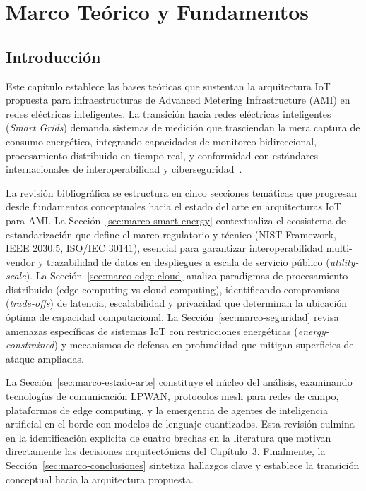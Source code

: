﻿\chapter{Marco Teórico y Fundamentos}
\label{chap:marco-teorico}


\section{Introducción}
\label{sec:marco-intro}

Este capítulo establece las bases teóricas que sustentan la arquitectura IoT propuesta para infraestructuras de Advanced Metering Infrastructure (AMI) en redes eléctricas inteligentes. La transición hacia redes eléctricas inteligentes (\textit{Smart Grids}) demanda sistemas de medición que trasciendan la mera captura de consumo energético, integrando capacidades de monitoreo bidireccional, procesamiento distribuido en tiempo real, y conformidad con estándares internacionales de interoperabilidad y ciberseguridad~\cite{SmartHomeEnergy2024,velasquezSmartGridsEmpowered2024}.

La revisión bibliográfica se estructura en cinco secciones temáticas que progresan desde fundamentos conceptuales hacia el estado del arte en arquitecturas IoT para AMI. La Sección~\ref{sec:marco-smart-energy} contextualiza el ecosistema de estandarización que define el marco regulatorio y técnico (NIST Framework, IEEE 2030.5, ISO/IEC 30141), esencial para garantizar interoperabilidad multi-vendor y trazabilidad de datos en despliegues a escala de servicio público (\textit{utility-scale}). La Sección~\ref{sec:marco-edge-cloud} analiza paradigmas de procesamiento distribuido (edge computing vs cloud computing), identificando compromisos (\textit{trade-offs}) de latencia, escalabilidad y privacidad que determinan la ubicación óptima de capacidad computacional. La Sección~\ref{sec:marco-seguridad} revisa amenazas específicas de sistemas IoT con restricciones energéticas (\textit{energy-constrained}) y mecanismos de defensa en profundidad que mitigan superficies de ataque ampliadas.

La Sección~\ref{sec:marco-estado-arte} constituye el núcleo del análisis, examinando tecnologías de comunicación LPWAN, protocolos mesh para redes de campo, plataformas de edge computing, y la emergencia de agentes de inteligencia artificial en el borde con modelos de lenguaje cuantizados. Esta revisión culmina en la identificación explícita de cuatro brechas en la literatura que motivan directamente las decisiones arquitectónicas del Capítulo~3. Finalmente, la Sección~\ref{sec:marco-conclusiones} sintetiza hallazgos clave y establece la transición conceptual hacia la arquitectura propuesta.

